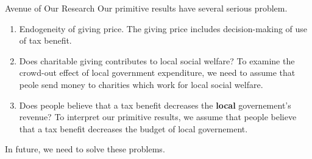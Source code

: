 \documentclass[
  ignorenonframetext,
]{beamer}
\providecommand{\tightlist}{%
  \setlength{\itemsep}{0pt}\setlength{\parskip}{0pt}}
\begin{document}
\begin{frame}{Avenue of Our Research}
\protect\hypertarget{avenue-of-our-research}{}
Our primitive results have several serious problem.

\begin{enumerate}
\tightlist
\item
  Endogeneity of giving price. The giving price includes decision-making
  of use of tax benefit.
\item
  Does charitable giving contributes to local social welfare? To examine
  the crowd-out effect of local government expenditure, we need to
  assume that peole send money to charities which work for local social
  welfare.
\item
  Does people believe that a tax benefit decreases the \textbf{local}
  governement's revenue? To interpret our primitive results, we assume
  that people believe that a tax benefit decreases the budget of local
  governement.
\end{enumerate}

In future, we need to solve these problems.
\end{frame}
\end{document}
